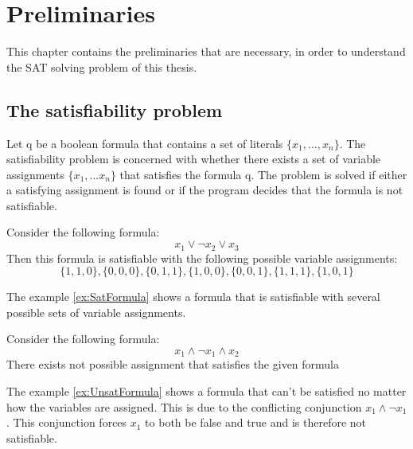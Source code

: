 
\chapter{Preliminaries}
\label{ch:Preliminaries}

This chapter contains the preliminaries that are necessary, in order to understand the SAT solving problem of this thesis.

\section{The satisfiability problem}
Let q be a boolean formula that contains a set of literals $\{x_1,...,x_n\}$. The satisfiability problem is concerned with whether there exists a set of variable assignments $\{x_1,...x_n\}$ that satisfies the formula q. The problem is solved if either a satisfying assignment is found or if the program decides that the formula is not satisfiable.

\begin{leftbar}
\label{ex:SatFormula}
Consider the following formula:
\begin{displaymath}
x_1 \vee \neg x_2 \vee x_3
\end{displaymath}
Then this formula is satisfiable with the following possible variable assignments:
\begin{displaymath}
\{1,1,0\},\{0,0,0\},\{0,1,1\},\{1,0,0\},\{0,0,1\},\{1,1,1\},\{1,0,1\}
\end{displaymath}
\end{leftbar}

The example \ref{ex:SatFormula} shows a formula that is satisfiable with several possible sets of variable assignments.

\begin{leftbar}
\label{ex:UnsatFormula}
Consider the following formula:
\begin{displaymath}
x_1 \wedge \neg x_1 \wedge x_2
\end{displaymath}
There exists not possible assignment that satisfies the given formula
\end{leftbar}

The example \ref{ex:UnsatFormula} shows a formula that can't be satisfied no matter how the variables are assigned. This is due to the conflicting conjunction $x_1 \wedge \neg x_1$. This conjunction forces $x_1$ to both be false and true and is therefore not satisfiable.

